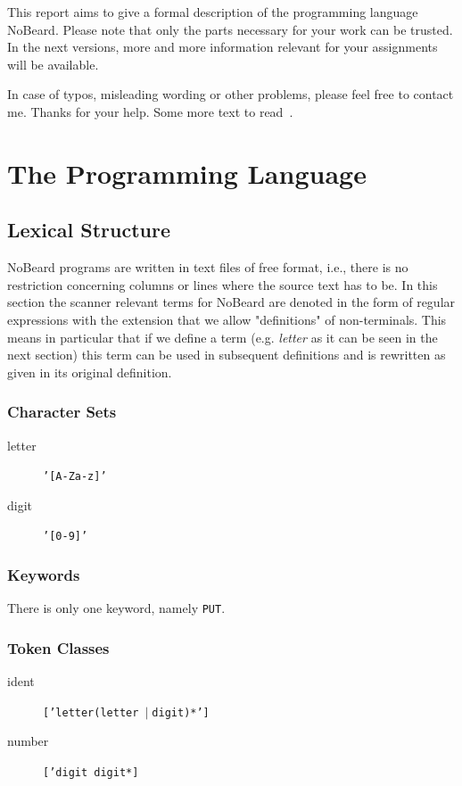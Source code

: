 \documentclass[11pt]{report}
\newcommand{\leongage}{NoBeard}
\newcommand{\alternative}{$\mid \;$}
\begin{document}
This report aims to give a formal description of the programming language \leongage. Please note that only the parts
necessary for your work can be trusted. In the next versions, more and more information relevant for your assignments
will be available.

In case of typos, misleading wording or other problems, please feel free to contact me. Thanks for your help. Some more text to read~\cite{terry_compiling_2004}. 

\chapter{The Programming Language}
\section{Lexical Structure}

\leongage{} programs are written in text files of free format, i.e., there is no restriction concerning columns or lines where
the source text has to be. In this section the scanner relevant terms for \leongage{} are denoted in the form of regular expressions
with the extension that we allow "definitions" of non-terminals. This means in particular that if we define a term (e.g.
{\em letter} as it can be seen in the next section) this term can be used in subsequent definitions and is rewritten as
given in its original definition.

\subsection{Character Sets}
\begin{description}
	\item[letter] \texttt{'[A-Za-z]'}
	\item[digit]\texttt{'[0-9]'}
\end{description}

\subsection{Keywords}
There is only one keyword, namely \texttt{PUT}.

\subsection{Token Classes}
\begin{description}
	\item[ident] \texttt{['letter(letter \alternative digit)*']}
	\item[number] \texttt{['digit digit*]}
\end{description}
\end{document}
